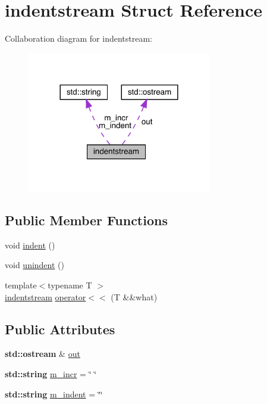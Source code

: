 \hypertarget{structindentstream}{}\section{indentstream Struct Reference}
\label{structindentstream}


Collaboration diagram for indentstream\+:
\nopagebreak
\begin{figure}[H]
\begin{center}
\leavevmode
\includegraphics[width=228pt]{structindentstream__coll__graph}
\end{center}
\end{figure}
\subsection*{Public Member Functions}
\begin{DoxyCompactItemize}
\item 
void \hyperlink{structindentstream_a698fbc575ef8753cf5b38d32a71cd1e4}{indent} ()
\item 
void \hyperlink{structindentstream_a3721933459c8e2ed2cac1de036d6f24d}{unindent} ()
\item 
{\footnotesize template$<$typename T $>$ }\\\hyperlink{structindentstream}{indentstream} \hyperlink{structindentstream_a15d0ddc057725bdfb44c9ac465d1324c}{operator$<$$<$} (T \&\&what)
\end{DoxyCompactItemize}
\subsection*{Public Attributes}
\begin{DoxyCompactItemize}
\item 
\textbf{ std\+::ostream} \& \hyperlink{structindentstream_a17982da2855e0f5ef4f7b7408bd41883}{out}
\item 
\textbf{ std\+::string} \hyperlink{structindentstream_aefdc4c013e4c61c0c81b08f954dcafd8}{m\+\_\+incr} = \char`\"{} \char`\"{}
\item 
\textbf{ std\+::string} \hyperlink{structindentstream_a679f1453bdd2a44b50d75e08e92132bc}{m\+\_\+indent} = \char`\"{}\char`\"{}
\end{DoxyCompactItemize}


